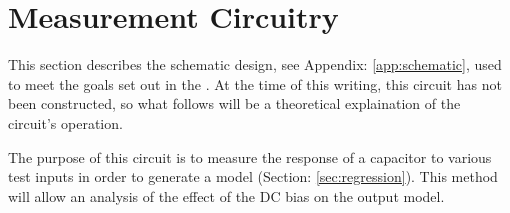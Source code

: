 \section {Measurement Circuitry}
\label{sec:measCirc}
This section describes the schematic design, see Appendix: \ref{app:schematic}, used to meet the goals set out in the . At the time of this writing, this circuit has not been constructed, so what follows will be a theoretical explaination of the circuit's operation.

The purpose of this circuit is to measure the response of a capacitor to various test inputs in order to generate a model (Section: \ref{sec:regression}). This method will allow an analysis of the effect of the DC bias on the output model.

\nocite{my_ieeePaper}













